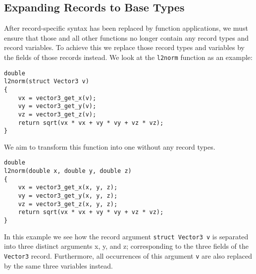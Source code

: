 
\subsection{Expanding Records to Base Types}\label{sec:expand}

After record-specific syntax has been replaced by function applications, we must ensure that those and all other functions no longer contain any record types and record variables.
To achieve this we replace those record types and variables by the fields of those records instead.
We look at the \texttt{l2norm} function as an example:
%
\begin{lstlisting}
double
l2norm(struct Vector3 v)
{
    vx = vector3_get_x(v);
    vy = vector3_get_y(v);
    vz = vector3_get_z(v);
    return sqrt(vx * vx + vy * vy + vz * vz);
}
\end{lstlisting}
%
We aim to transform this function into one without any record types.
%
\begin{lstlisting}
double
l2norm(double x, double y, double z)
{
    vx = vector3_get_x(x, y, z);
    vy = vector3_get_y(x, y, z);
    vz = vector3_get_z(x, y, z);
    return sqrt(vx * vx + vy * vy + vz * vz);
}
\end{lstlisting}
%
In this example we see how the record argument \texttt{struct Vector3 v} is separated into three distinct arguments x, y, and z; corresponding to the three fields of the \texttt{Vector3} record.
Furthermore, all occurrences of this argument \texttt{v} are also replaced by the same three variables instead.

